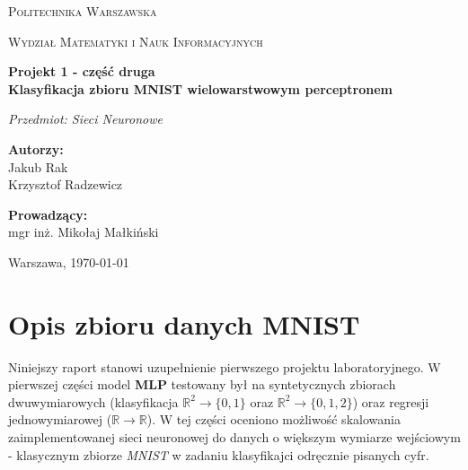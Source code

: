 \documentclass[11pt,a4paper]{article}
\begin{document}

\begin{titlepage}
    \centering
    \vspace*{1.5cm}
    
    {\scshape\Large Politechnika Warszawska \par}
    \vspace{0.3cm}
    {\scshape\large Wydział Matematyki i Nauk Informacyjnych \par}
    
    \vspace{2.5cm}
    
    {\huge\bfseries Projekt 1 - część druga\\[0.3em]Klasyfikacja zbioru MNIST wielowarstwowym perceptronem\par}
    
    
    \vspace{0.8cm}
    {\Large\itshape Przedmiot: Sieci Neuronowe \par}
    
    \vspace{3.0cm}
    
    \begin{minipage}[t]{0.48\textwidth}
        \flushleft
        \textbf{Autorzy:}\\[0.3em]
        Jakub Rak\\
        Krzysztof Radzewicz
    \end{minipage}
    \hfill
    \begin{minipage}[t]{0.48\textwidth}
        \flushright
        \textbf{Prowadzący:}\\[0.3em]
        mgr inż. Mikołaj Małkiński
    \end{minipage}
    \vfill
    
    {\large Warszawa, \today \par}
\end{titlepage}

\tableofcontents
\newpage


\section{Opis zbioru danych MNIST}

Niniejszy raport stanowi uzupełnienie pierwszego projektu laboratoryjnego.
W pierwszej części model \textbf{MLP} testowany był na syntetycznych zbiorach dwuwymiarowych
(klasyfikacja $\mathbb{R}^2 \to \{0, 1\}$ oraz $\mathbb{R}^2 \to \{0, 1, 2\}$) oraz regresji jednowymiarowej ($\mathbb{R} \to \mathbb{R}$).
W tej części oceniono możliwość skalowania zaimplementowanej sieci neuronowej do danych o większym wymiarze wejściowym -
klasycznym zbiorze \textit{MNIST} w zadaniu klasyfikajci odręcznie pisanych cyfr.
\end{document}
